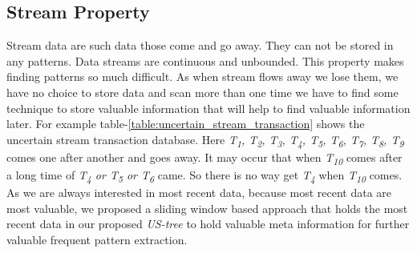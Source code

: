     \subsection{Stream Property}
    Stream data are such data those come and go away. They can not be stored in any patterns. Data streams are continuous and unbounded. This property makes finding patterns so much difficult. As when stream flows away we lose them, we have no choice to store data and scan more than one time we have to find some technique to store valuable information that will help to find valuable information later. For example table-\ref{table:uncertain_stream_transaction} shows the uncertain stream transaction database. Here \emph{T\textsubscript{1}, T\textsubscript{2}, T\textsubscript{3}, T\textsubscript{4}, T\textsubscript{5}, T\textsubscript{6}, T\textsubscript{7}, T\textsubscript{8}, T\textsubscript{9}} comes one after another and goes away. It may occur that when \emph{T\textsubscript{10}} comes after a long time of \emph{T\textsubscript{4} or T\textsubscript{5} or T\textsubscript{6}} came. So there is no way get \emph{T\textsubscript{4}} when \emph{T\textsubscript{10}} comes. As we are always interested in most recent data, because most recent data are most valuable, we proposed a sliding window based approach that holds the most recent data in our proposed \emph{US-tree} to hold valuable meta information for further valuable frequent pattern extraction.

